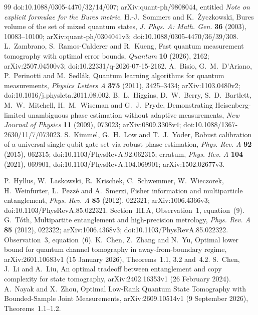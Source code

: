\begin{thebibliography}{99}
doi:10.1088/0305-4470/32/14/007;
arXiv:quant-ph/9808044, entitled
\emph{Note on explicit formulae for the Bures metric}.
 H.-J.~Sommers and K.~\.{Z}yczkowski,
Bures volume of the set of mixed quantum states,
\emph{J. Phys. A: Math. Gen.} \textbf{36} (2003), 10083--10100;
arXiv:quant-ph/0304041v3; doi:10.1088/0305-4470/36/39/308.
 L.~Zambrano, S.~Ramos-Calderer and R.~Kueng,
Fast quantum measurement tomography with optimal error bounds,
\emph{Quantum} \textbf{10} (2026), 2162;
arXiv:2507.04500v3; doi:10.22331/q-2026-07-15-2162.
 A.~Bisio, G.~M.~D'Ariano, P.~Perinotti and M.~Sedl\'ak,
Quantum learning algorithms for quantum measurements,
\emph{Physics Letters A} \textbf{375} (2011), 3425--3434;
arXiv:1103.0480v2; doi:10.1016/j.physleta.2011.08.002.
 B.~L.~Higgins, D.~W.~Berry, S.~D.~Bartlett,
M.~W.~Mitchell, H.~M.~Wiseman and G.~J.~Pryde,
Demonstrating Heisenberg-limited unambiguous phase estimation
without adaptive measurements,
\emph{New Journal of Physics} \textbf{11} (2009), 073023;
arXiv:0809.3308v4; doi:10.1088/1367-2630/11/7/073023.
 S.~Kimmel, G.~H.~Low and T.~J.~Yoder,
Robust calibration of a universal single-qubit gate set via robust phase estimation,
\emph{Phys. Rev. A} \textbf{92} (2015), 062315;
doi:10.1103/PhysRevA.92.062315;
erratum, \emph{Phys. Rev. A} \textbf{104} (2021), 069901,
doi:10.1103/PhysRevA.104.069901; arXiv:1502.02677v3.

 P.~Hyllus, W.~Laskowski, R.~Krischek,
C.~Schwemmer, W.~Wieczorek, H.~Weinfurter, L.~Pezz\'e and A.~Smerzi,
Fisher information and multiparticle entanglement,
\emph{Phys. Rev. A} \textbf{85} (2012), 022321;
arXiv:1006.4366v3; doi:10.1103/PhysRevA.85.022321.
Section~III.A, Observation~1, equation~(9).
 G.~T\'oth,
Multipartite entanglement and high-precision metrology,
\emph{Phys. Rev. A} \textbf{85} (2012), 022322;
arXiv:1006.4368v3; doi:10.1103/PhysRevA.85.022322.
Observation~3, equation~(6).
 K.~Chen, Z.~Zhang and N.~Yu,
Optimal lower bound for quantum channel tomography in away-from-boundary regime,
arXiv:2601.10683v1 (15 January 2026), Theorems~1.1, 3.2 and~4.2.
 S.~Chen, J.~Li and A.~Liu,
An optimal tradeoff between entanglement and copy complexity for state tomography,
arXiv:2402.16353v1 (26 February 2024).
 A.~Nayak and X.~Zhou,
Optimal Low-Rank Quantum State Tomography with Bounded-Sample Joint Measurements,
arXiv:2609.10514v1 (9 September 2026), Theorems~1.1--1.2.

\end{thebibliography}
